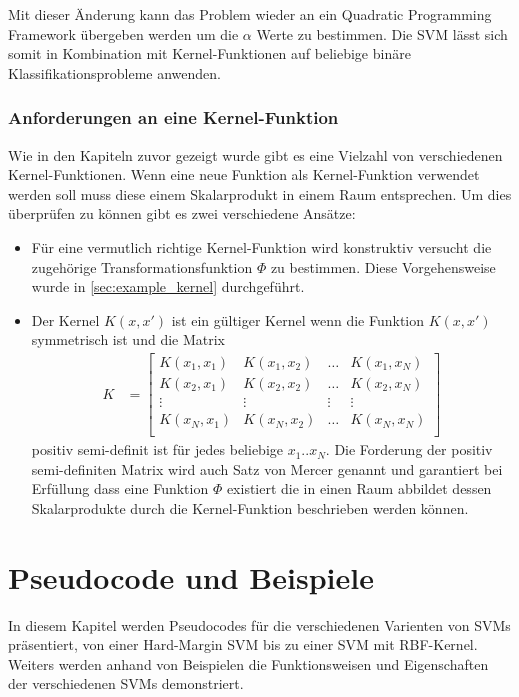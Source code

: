\documentclass[a4paper,11pt,twoside]{scrreprt}
\begin{document}
Mit dieser Änderung kann das Problem wieder an ein Quadratic Programming Framework übergeben werden um die $\alpha$ Werte zu bestimmen. Die \ac{SVM} lässt sich somit in Kombination mit Kernel-Funktionen auf beliebige binäre Klassifikationsprobleme anwenden. 


\subsection{Anforderungen an eine Kernel-Funktion} \label{sec:kernel_conditions}
Wie in den Kapiteln zuvor gezeigt wurde gibt es eine Vielzahl von verschiedenen Kernel-Funktionen. Wenn eine neue Funktion als Kernel-Funktion verwendet werden soll muss diese einem Skalarprodukt in einem Raum entsprechen. Um dies überprüfen zu können gibt es zwei verschiedene Ansätze:

\begin{itemize}
	\item Für eine vermutlich richtige Kernel-Funktion wird konstruktiv versucht die zugehörige Transformationsfunktion $\Phi$ zu bestimmen. Diese Vorgehensweise wurde in \autoref{sec:example_kernel} durchgeführt.
	
	\item Der Kernel $K(x, x')$ ist ein gültiger Kernel wenn die Funktion $K(x, x')$ symmetrisch ist und die Matrix \[ 	
	\begin{aligned}
		K &= 
		\begin{bmatrix} 
			K(x_{1}, x_{1}) & K(x_{1}, x_{2}) & \dots & K(x_{1}, x_{N})\\
			K(x_{2}, x_{1}) & K(x_{2}, x_{2}) & \dots & K(x_{2}, x_{N})\\
			\vdots & \vdots & \vdots & \vdots\\
			K(x_{N}, x_{1}) & K(x_{N}, x_{2}) & \dots & K(x_{N}, x_{N})\\ 
		\end{bmatrix}
	\end{aligned}
\] positiv semi-definit ist für jedes beliebige $x_1..x_N$. Die Forderung der positiv semi-definiten Matrix wird auch Satz von Mercer genannt und garantiert bei Erfüllung dass eine Funktion $\Phi$ existiert die in einen Raum abbildet dessen Skalarprodukte durch die Kernel-Funktion beschrieben werden können. 
\end{itemize}


\chapter{Pseudocode und Beispiele} \label{ch:pseudobsp}
In diesem Kapitel werden Pseudocodes für die verschiedenen Varienten von SVMs präsentiert, von einer Hard-Margin SVM bis zu einer SVM mit RBF-Kernel.
Weiters werden anhand von Beispielen die Funktionsweisen und Eigenschaften der verschiedenen SVMs demonstriert.
\end{document}
